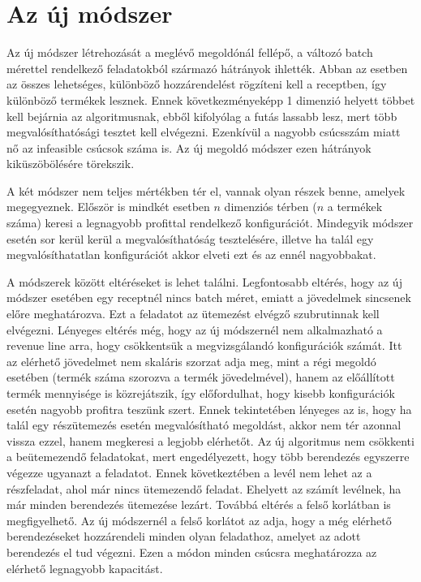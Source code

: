 \chapter{Az új módszer}
Az új módszer létrehozását a meglévő megoldónál fellépő, a változó batch mérettel rendelkező feladatokból származó hátrányok ihlették.
Abban az esetben az összes lehetséges, különböző hozzárendelést rögzíteni kell a receptben, így különböző termékek lesznek.
Ennek következményeképp 1 dimenzió helyett többet kell bejárnia az algoritmusnak, ebből kifolyólag a futás lassabb lesz, mert több megvalósíthatósági tesztet kell elvégezni.
Ezenkívül a nagyobb csúcsszám miatt nő az infeasible csúcsok száma is.
Az új megoldó módszer ezen hátrányok kiküszöbölésére törekszik. 

A két módszer nem teljes mértékben tér el, vannak olyan részek benne, amelyek megegyeznek.
Először is mindkét esetben $n$ dimenziós térben ($n$ a termékek száma) keresi a legnagyobb profittal rendelkező konfigurációt.
Mindegyik módszer esetén sor kerül kerül a megvalósíthatóság tesztelésére, illetve ha talál egy megvalósíthatatlan konfigurációt akkor elveti ezt és az ennél nagyobbakat. 

A módszerek között eltéréseket is lehet találni.
Legfontosabb eltérés, hogy az új módszer esetében egy receptnél nincs batch méret, emiatt a jövedelmek sincsenek előre meghatározva.
Ezt a feladatot az ütemezést elvégző szubrutinnak kell elvégezni.
Lényeges eltérés még, hogy az új módszernél nem alkalmazható a revenue line arra, hogy csökkentsük a megvizsgálandó konfigurációk számát.
Itt az elérhető jövedelmet nem skaláris szorzat adja meg, mint a régi megoldó esetében (termék száma szorozva a termék jövedelmével), hanem az előállított termék mennyisége is közrejátszik, így előfordulhat, hogy kisebb konfigurációk esetén nagyobb profitra teszünk szert.
Ennek tekintetében lényeges az is, hogy ha talál egy részütemezés esetén megvalósítható megoldást, akkor nem tér azonnal vissza ezzel, hanem megkeresi a legjobb elérhetőt.
Az új algoritmus nem csökkenti a beütemezendő feladatokat, mert engedélyezett, hogy több berendezés egyszerre végezze ugyanazt a feladatot.
Ennek következtében a levél nem lehet az a részfeladat, ahol már nincs ütemezendő feladat.
Ehelyett az számít levélnek, ha már minden berendezés ütemezése lezárt.
Továbbá eltérés a felső korlátban is megfigyelhető.
Az új módszernél a felső korlátot az adja, hogy a még elérhető berendezéseket hozzárendeli minden olyan feladathoz, amelyet az adott berendezés el tud végezni.
Ezen a módon minden csúcsra meghatározza az elérhető legnagyobb kapacitást.

